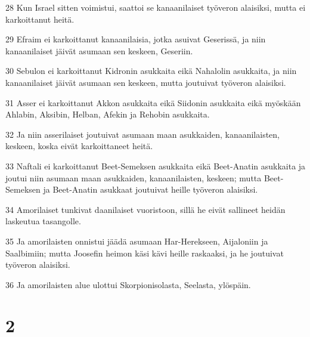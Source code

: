 \par 28 Kun Israel sitten voimistui, saattoi se kanaanilaiset työveron alaisiksi, mutta ei karkoittanut heitä.
\par 29 Efraim ei karkoittanut kanaanilaisia, jotka asuivat Geserissä, ja niin kanaanilaiset jäivät asumaan sen keskeen, Geseriin.
\par 30 Sebulon ei karkoittanut Kidronin asukkaita eikä Nahalolin asukkaita, ja niin kanaanilaiset jäivät asumaan sen keskeen, mutta joutuivat työveron alaisiksi.
\par 31 Asser ei karkoittanut Akkon asukkaita eikä Siidonin asukkaita eikä myöskään Ahlabin, Aksibin, Helban, Afekin ja Rehobin asukkaita.
\par 32 Ja niin asserilaiset joutuivat asumaan maan asukkaiden, kanaanilaisten, keskeen, koska eivät karkoittaneet heitä.
\par 33 Naftali ei karkoittanut Beet-Semeksen asukkaita eikä Beet-Anatin asukkaita ja joutui niin asumaan maan asukkaiden, kanaanilaisten, keskeen; mutta Beet-Semeksen ja Beet-Anatin asukkaat joutuivat heille työveron alaisiksi.
\par 34 Amorilaiset tunkivat daanilaiset vuoristoon, sillä he eivät sallineet heidän laskeutua tasangolle.
\par 35 Ja amorilaisten onnistui jäädä asumaan Har-Herekseen, Aijaloniin ja Saalbimiin; mutta Joosefin heimon käsi kävi heille raskaaksi, ja he joutuivat työveron alaisiksi.
\par 36 Ja amorilaisten alue ulottui Skorpionisolasta, Seelasta, ylöspäin.

\chapter{2}

